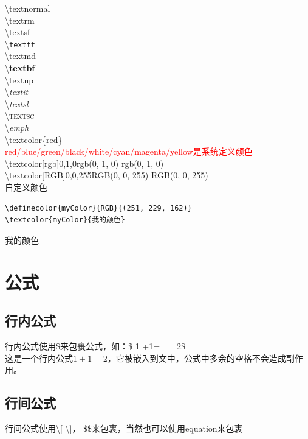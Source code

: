 \documentclass{article}
\begin{document}
	\large 
	
	\noindent\textbackslash\textnormal{textnormal}\\
	\textbackslash\textrm{textrm}\\
	\textbackslash\textsf{textsf}\\
	\textbackslash\texttt{texttt}\\
	\textbackslash\textmd{textmd}\\
	\textbackslash\textbf{textbf}\\
	\textbackslash\textup{textup}\\
	\textbackslash\textit{textit}\\
	\textbackslash\textsl{textsl}\\
	\textbackslash\textsc{textsc}\\
	\textbackslash\emph{emph}\\
	
	
	\noindent\textbackslash textcolor\{red\}\\
	\textcolor{red}{red/blue/green/black/white/cyan/magenta/yellow是系统定义颜色}\\
	\textbackslash textcolor[rgb]{0,1,0}{rgb(0, 1, 0)}
	\textcolor[rgb]{0,1,0}{rgb(0, 1, 0)}\\
	\textbackslash textcolor[RGB]{0,0,255}{RGB(0, 0, 255)}
	\textcolor[RGB]{0,0,255}{RGB(0, 0, 255)}\\
	
	\noindent 自定义颜色\\
	\begin{lstlisting}
\definecolor{myColor}{RGB}{(251, 229, 162)}
\textcolor{myColor}{我的颜色}
	\end{lstlisting}

	\textcolor{myColor}{我的颜色}

	
	\section{公式}
	\subsection{行内公式}
	\normalsize
	\noindent 行内公式使用\$来包裹公式，如：\$ 1 +1=\ \ \ \ 2\$\\
	这是一个行内公式$ 1 +1 =    2 $，它被嵌入到文中，公式中多余的空格不会造成副作用。
	
	\subsection{行间公式}
	\noindent 行间公式使用\textbackslash[ \textbackslash]， \$\$来包裹，当然也可以使用equation来包裹
	
\end{document}
